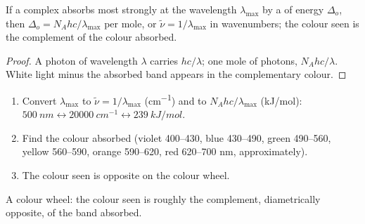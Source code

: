 \begin{proposition}\label{prop:b2:ligand-field:colour}
If a complex absorbs most strongly at the wavelength $\lambda_{\max}$ by a 
of energy $\Delta_o$, then $\Delta_o = N_Ahc/\lambda_{\max}$ per mole, or $\tilde\nu = 1/\lambda_{\max}$
in wavenumbers; the colour seen is the complement of the colour absorbed.
\end{proposition}

\begin{proof}
A photon of wavelength $\lambda$ carries $hc/\lambda$; one mole of photons, $N_Ahc/\lambda$. White
light minus the absorbed band appears in the complementary colour.
\end{proof}

\begin{method}\label{met:b2:ligand-field:colour}
\begin{enumerate}
  \item Convert $\lambda_{\max}$ to $\tilde\nu = 1/\lambda_{\max}$ (\unit{cm^{-1}}) and to
        $N_Ahc/\lambda_{\max}$ (\unit{kJ/mol}): $\qty{500}{nm} \leftrightarrow \qty{20000}{cm^{-1}}
        \leftrightarrow \qty{239}{kJ/mol}$.
  \item Find the colour absorbed (violet 400--430, blue 430--490, green 490--560, yellow
        560--590, orange 590--620, red 620--700 nm, approximately).
  \item The colour seen is opposite on the colour wheel.
\end{enumerate}
\end{method}

\begin{omfigure}

{\small A colour wheel: the colour seen is roughly the complement, diametrically
opposite, of the band absorbed.}
\end{omfigure}

